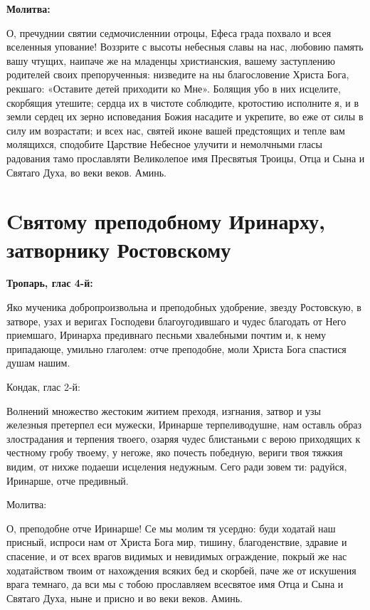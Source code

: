 \bfseries Молитва:\normalfont{}\nopagebreak


О, пречуднии святии седмочисленнии отроцы, Ефеса града похвало и всея вселенныя упование! Воззрите с высоты небесныя славы на нас, любовию память вашу чтущих, наипаче же на младенцы христианския, вашему заступлению родителей своих препорученныя: низведите на ны благословение Христа Бога, рекшаго: «Оставите детей приходити ко Мне». Болящия убо в них исцелите, скорбящия утешите; сердца их в чистоте соблюдите, кротостию исполните я, и в земли сердец их зерно исповедания Божия насадите и укрепите, во еже от силы в силу им возрастати; и всех нас, святей иконе вашей предстоящих и тепле вам молящихся, сподобите Царствие Небесное улучити и немолчными гласы радования тамо прославляти Великолепое имя Пресвятыя Троицы, Отца и Сына и Святаго Духа, во веки веков. Аминь.


\section{Cвятому преподобному Иринарху, затворнику Ростовскому}
 


\bfseries Тропарь, глас 4-й:\normalfont{}\nopagebreak


Яко мученика добропроизвольна и преподобных удобрение, звезду Ростовскую, в затворе, узах и веригах Господеви благоугодившаго и чудес благодать от Него приемшаго, Иринарха предивнаго песньми хвалебными почтим и, к нему припадающе, умильно глаголем: отче преподобне, моли Христа Бога спастися душам нашим. 

\bfseries 

Кондак, глас 2-й:\normalfont{}


 Волнений множество жестоким житием преходя, изгнания, затвор и узы железныя претерпел еси мужески, Иринарше терпеливодушне, нам оставль образ злострадания и терпения твоего, озаряя чудес блистаньми с верою приходящих к честному гробу твоему, у негоже, яко почесть победную, вериги твоя тяжкия видим, от нихже подаеши исцеления недужным. Сего ради зовем ти: радуйся, Иринарше, отче предивный. 

\bfseries 

Молитва:\normalfont{}


О, преподобне отче Иринарше! Се мы молим тя усердно: буди ходатай наш присный, испроси нам от Христа Бога мир, тишину, благоденствие, здравие и спасение, и от всех врагов видимых и невидимых ограждение, покрый же нас ходатайством твоим от нахождения всяких бед и скорбей, паче же от искушения врага темнаго, да вси мы с тобою прославляем всесвятое имя Отца и Сына и Святаго Духа, ныне и присно и во веки веков. Аминь. 
\nopagebreak\bigskip\bigskip\mychapterending

